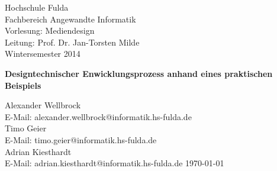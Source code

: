 
\begin{titlepage}

	\begin{small}
		\vfill {Hochschule Fulda\\
		Fachbereich Angewandte Informatik\\ 
		Vorlesung: Mediendesign\\
		Leitung: Prof. Dr. Jan-Torsten Milde\\
		Wintersemester 2014}
	\end{small}

	\begin{center}
		\begin{Large}
			\vfill {\textsf{\textbf{
			Designtechnischer Enwicklungsprozess anhand eines praktischen Beispiels
			}}}
		\end{Large}
	\end{center}

	\begin{small}
		\vfill Alexander Wellbrock\\ E-Mail: alexander.wellbrock@informatik.hs-fulda.de\\
		Timo Geier\\ E-Mail: timo.geier@informatik.hs-fulda.de\\
		Adrian Kiesthardt\\ E-Mail: adrian.kiesthardt@informatik.hs-fulda.de
		\today
	\end{small}

\end{titlepage}